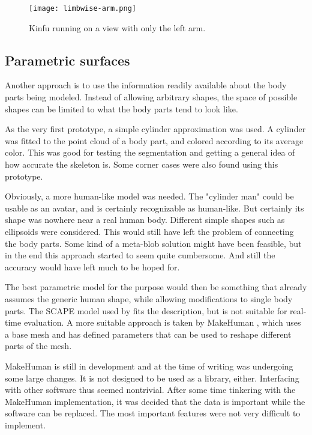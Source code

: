 \begin{figure}
    \centering
    \texttt{[image: limbwise-arm.png]}
    \caption{Kinfu running on a view with only the left arm.}
    \label{fig:limbwise-arm}
\end{figure}

\subsection{Parametric surfaces}

Another approach is to use the information readily available about the body parts being modeled. Instead of allowing arbitrary shapes, the space of possible shapes can be limited to what the body parts tend to look like.

As the very first prototype, a simple cylinder approximation was used. A cylinder was fitted to the point cloud of a body part, and colored according to its average color. This was good for testing the segmentation and getting a general idea of how accurate the skeleton is. Some corner cases were also found using this prototype.  

Obviously, a more human-like model was needed. The "cylinder man" could be usable as an avatar, and is certainly recognizable as human-like. But certainly its shape was nowhere near a real human body. Different simple shapes such as ellipsoids were considered. This would still have left the problem of connecting the body parts. Some kind of a meta-blob solution might have been feasible, but in the end this approach started to seem quite cumbersome. And still the accuracy would have left much to be hoped for.

The best parametric model for the purpose would then be something that already assumes the generic human shape, while allowing  modifications to single body parts. The SCAPE model \citep{anguelov2005scape} used by \citet{weiss2011home} fits the description, but is not suitable for real-time evaluation. A more suitable approach is taken by MakeHuman \citep{makehuman}, which uses a base mesh and has defined parameters that can be used to reshape different parts of the mesh.

MakeHuman is still in development and at the time of writing was undergoing some large changes. It is not designed to be used as a library, either. Interfacing with other software thus seemed nontrivial. After some time tinkering with the MakeHuman implementation, it was decided that the data is important while the software can be replaced. The most important features were not very difficult to implement.

